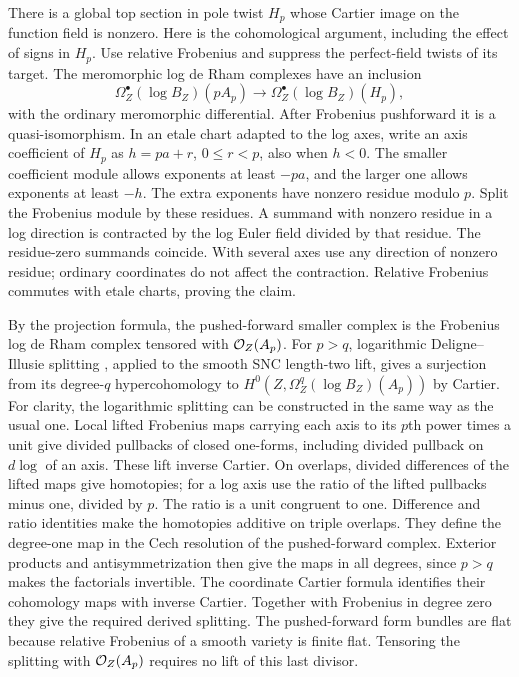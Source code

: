 There is a global top section in pole twist $H_p$ whose Cartier
image on the function field is nonzero. Here is the cohomological
argument, including the effect of signs in $H_p$. Use relative
Frobenius and suppress the perfect-field twists of its target.
The meromorphic log de Rham complexes have an inclusion
\begin{equation}\label{car:complex-inclusion}
 \Omega_Z^\bullet(\log B_Z)(pA_p)
 \longrightarrow \Omega_Z^\bullet(\log B_Z)(H_p),
\end{equation}
with the ordinary meromorphic differential. After Frobenius
pushforward it is a quasi-isomorphism. In an etale chart adapted
to the log axes, write an axis coefficient of $H_p$ as
$h=pa+r$, $0\le r<p$, also when $h<0$. The smaller coefficient
module allows exponents at least $-pa$, and the larger one
allows exponents at least $-h$. The extra exponents have nonzero
residue modulo $p$. Split the Frobenius module by these residues.
A summand with nonzero residue in a log direction is contracted
by the log Euler field divided by that residue. The residue-zero
summands coincide. With several axes use any direction of nonzero
residue; ordinary coordinates do not affect the contraction.
Relative Frobenius commutes with etale charts, proving the claim.

By the projection formula, the pushed-forward smaller complex
is the Frobenius log de Rham complex tensored with $\mathcal O_Z(A_p)$.
For $p>q$, logarithmic Deligne--Illusie splitting
\cite[Section~4.2.3]{DeligneIllusie}, applied to the smooth SNC length-two lift,
gives a surjection from its degree-$q$ hypercohomology to
$H^0(Z,\Omega_Z^q(\log B_Z)(A_p))$ by Cartier.
For clarity, the logarithmic splitting can be constructed in the
same way as the usual one. Local lifted Frobenius maps carrying
each axis to its $p$th power times a unit give divided pullbacks
of closed one-forms, including divided pullback on $d\log$ of
an axis. These lift inverse Cartier. On overlaps, divided
differences of the lifted maps give homotopies; for a log axis
use the ratio of the lifted pullbacks minus one, divided by $p$.
The ratio is a unit congruent to one. Difference and ratio
identities make the homotopies additive on triple overlaps.
They define the degree-one map in the Cech resolution of the
pushed-forward complex. Exterior products and antisymmetrization
then give the maps in all degrees, since $p>q$ makes the
factorials invertible. The coordinate Cartier formula identifies
their cohomology maps with inverse Cartier. Together with
Frobenius in degree zero they give the required derived splitting.
The pushed-forward form bundles are flat because relative
Frobenius of a smooth variety is finite flat. Tensoring the
splitting with $\mathcal O_Z(A_p)$ requires no lift of this last divisor.

